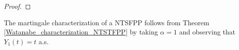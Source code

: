 \documentclass[11pt,oneside,reqno]{amsart}
\theoremstyle{definition}
\newtheorem{corollary}{Corollary}[section]
\theoremstyle{remarkstyle}
\begin{document}
\begin{proof}
\end{proof}
The martingale characterization of a NTSFPP follows from Theorem
\ref{Watanabe_characterization_NTSTFPP} by taking $\alpha=1$ and observing that $Y_{1}(t)=t$ a.s.
\end{document}

